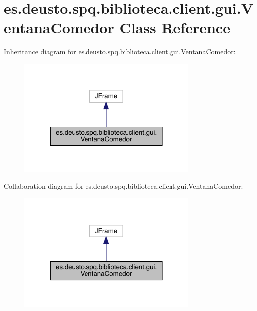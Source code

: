 \hypertarget{classes_1_1deusto_1_1spq_1_1biblioteca_1_1client_1_1gui_1_1_ventana_comedor}{}\section{es.\+deusto.\+spq.\+biblioteca.\+client.\+gui.\+Ventana\+Comedor Class Reference}
\label{classes_1_1deusto_1_1spq_1_1biblioteca_1_1client_1_1gui_1_1_ventana_comedor}


Inheritance diagram for es.\+deusto.\+spq.\+biblioteca.\+client.\+gui.\+Ventana\+Comedor\+:
\nopagebreak
\begin{figure}[H]
\begin{center}
\leavevmode
\includegraphics[width=248pt]{classes_1_1deusto_1_1spq_1_1biblioteca_1_1client_1_1gui_1_1_ventana_comedor__inherit__graph}
\end{center}
\end{figure}


Collaboration diagram for es.\+deusto.\+spq.\+biblioteca.\+client.\+gui.\+Ventana\+Comedor\+:
\nopagebreak
\begin{figure}[H]
\begin{center}
\leavevmode
\includegraphics[width=248pt]{classes_1_1deusto_1_1spq_1_1biblioteca_1_1client_1_1gui_1_1_ventana_comedor__coll__graph}
\end{center}
\end{figure}
